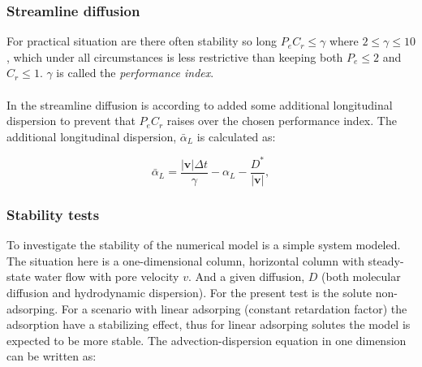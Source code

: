 \documentclass{report}
\begin{document}
\subsubsection{Streamline diffusion}

For practical situation are there often stability so long $P_eC_r\leq
 \gamma$ where $2\leq \gamma \leq 10$, \cite{Perrochet}  which under all
 circumstances is less restrictive than keeping both $P_e\leq 2$ and
 $C_r\leq 1$. $\gamma$ is called the \textit{performance index}.\\
\\
In the streamline diffusion is according to \cite{Perrochet} added
some additional longitudinal dispersion to prevent that $P_eC_r$
raises over the chosen performance index. The additional
longitudinal dispersion, $\bar{\alpha}_L$ is calculated as:



\begin{equation}
\bar{\alpha}_L= \frac{|\mathbf{v}|\Delta
    t}{\gamma}-\alpha_L-\frac{D^{*}}{|\mathbf{v}|},
\end{equation}




\subsubsection{Stability tests}

To investigate the stability of the numerical model is a simple system
 modeled. The situation here is a one-dimensional column, horizontal
 column with steady-state water flow with pore velocity $v$. And a given
diffusion, $D$ (both molecular diffusion and hydrodynamic
dispersion). For the present test is the solute non-adsorping. For a
scenario with linear adsorping (constant retardation factor) the
adsorption have a stabilizing effect, thus for linear adsorping solutes
the model is expected to be more stable. The advection-dispersion
equation in one dimension can be written as:
\end{document}
